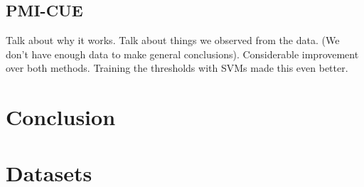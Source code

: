 \documentclass[11pt]{report} %
\begin{document}
	\section{PMI-CUE}

Talk about why it works. Talk about things we observed from the data. (We don't have enough
data to make general conclusions). Considerable improvement over both methods. Training the
thresholds with SVMs made this even better.

\chapter{Conclusion}

\appendix
\chapter{Datasets}


%


\end{document}
